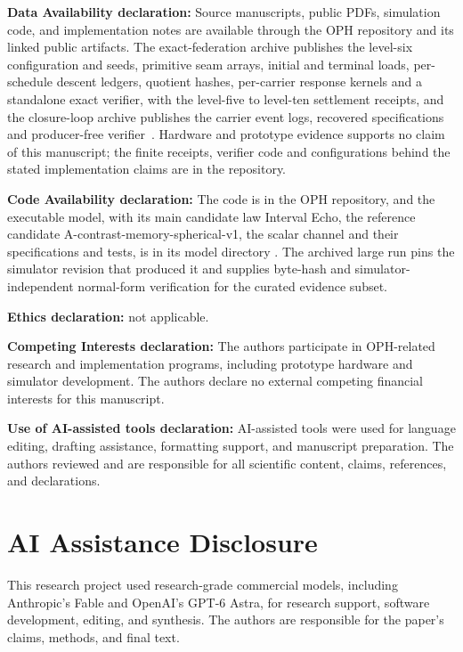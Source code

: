 \documentclass[11pt]{article}
\begin{document}
\noindent\textbf{Data Availability declaration:} Source manuscripts, public
PDFs, simulation code, and implementation notes are available through the OPH
repository and its linked public artifacts. The exact-federation archive
publishes the level-six configuration and seeds, primitive seam arrays,
initial and terminal loads, per-schedule descent ledgers, quotient hashes,
per-carrier response kernels and a standalone exact verifier, with the
level-five to level-ten settlement receipts, and the closure-loop archive
publishes the carrier event logs, recovered specifications and producer-free
verifier~\cite{ophfpe}. Hardware and prototype evidence supports no claim of this manuscript; the finite receipts, verifier code and configurations behind the stated implementation claims are in the repository.

\noindent\textbf{Code Availability declaration:} The code is in the OPH repository, and the executable model, with its main candidate law Interval Echo, the reference candidate A-contrast-memory-spherical-v1, the scalar channel and their specifications and tests, is in its model directory \cite{ophrepo}. The archived large run pins the simulator revision that produced
it and supplies byte-hash and simulator-independent normal-form verification
for the curated evidence subset.

\noindent\textbf{Ethics declaration:} not applicable.

\noindent\textbf{Competing Interests declaration:} The authors participate in OPH-related research
and implementation programs, including prototype hardware and simulator development. The authors
declare no external competing financial interests for this manuscript.

\noindent\textbf{Use of AI-assisted tools declaration:} AI-assisted tools were used for language
editing, drafting assistance, formatting support, and manuscript preparation. The authors
reviewed and are responsible for all scientific content, claims, references, and declarations.

\section*{AI Assistance Disclosure}
This research project used research-grade commercial models, including
Anthropic's Fable and OpenAI's GPT-6 Astra, for research support, software
development, editing, and synthesis. The authors are responsible for the
paper's claims, methods, and final text.
\end{document}
